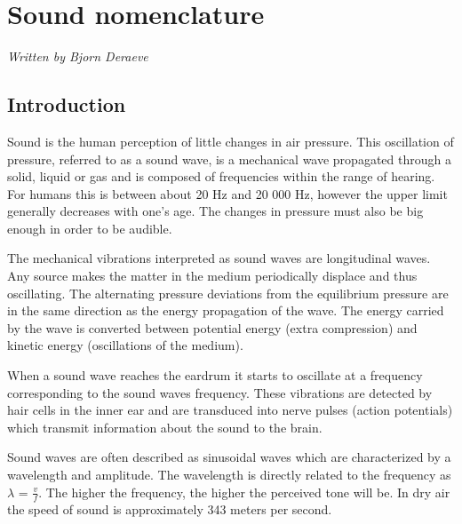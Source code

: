 
\chapter{Sound nomenclature} %
\label{Chapter1} %
\textsf{\textsl{Written by Bjorn Deraeve}}

\section{Introduction}
Sound is the human perception of little changes in air pressure. This oscillation of pressure, referred to as a sound wave, is a mechanical wave propagated through a solid, liquid or gas and is composed of frequencies within the range of hearing. For humans this is between about 20 Hz and 20 000 Hz, however the upper limit generally decreases with one's age.   The changes in pressure must also be big enough in order to be audible.

The mechanical vibrations interpreted as sound waves are longitudinal waves. Any source makes the matter in the medium periodically displace and thus oscillating. The alternating pressure deviations from the equilibrium pressure are in the same direction as the energy propagation of the wave. The energy carried by the wave is converted between potential energy (extra compression) and kinetic energy (oscillations of the medium).

When a sound wave reaches the eardrum it starts to oscillate at a frequency corresponding to the sound waves frequency. These vibrations are detected by hair cells in the inner ear and are transduced into nerve pulses (action potentials) which transmit information about the sound to the brain.

Sound waves are often described as sinusoidal waves which are characterized by a wavelength and amplitude. The wavelength is directly related to the frequency as $\lambda$ = $\frac{v}{f}$.  The higher the frequency, the higher the perceived tone will be. In dry air the speed of sound is approximately 343 meters per second. 

